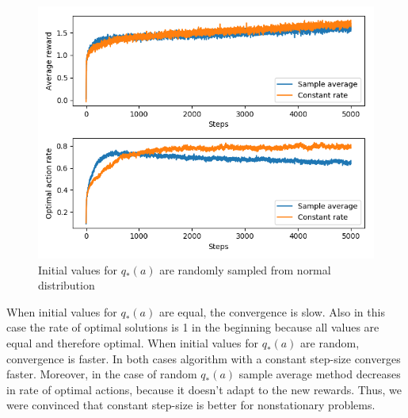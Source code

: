 \documentclass[12pt, a4paper]{article}
\begin{document}
        \begin{figure}[H]
            \centering
            \includegraphics[width=0.8\linewidth]{2.png}
            \caption{Initial values for $q_*(a)$ are randomly sampled from normal distribution}
        \end{figure}

        When initial values for $q_*(a)$ are equal, the convergence is slow. Also in this case the rate of optimal solutions is 1 in the beginning because all values are equal and therefore optimal. When initial values for $q_*(a)$ are random, convergence is faster. In both cases algorithm with a constant step-size converges faster. Moreover, in the case of random $q_*(a)$ sample average method decreases in rate of optimal actions, because it doesn't adapt to the new rewards. Thus, we were convinced that constant step-size is better for nonstationary problems.
\end{document}
